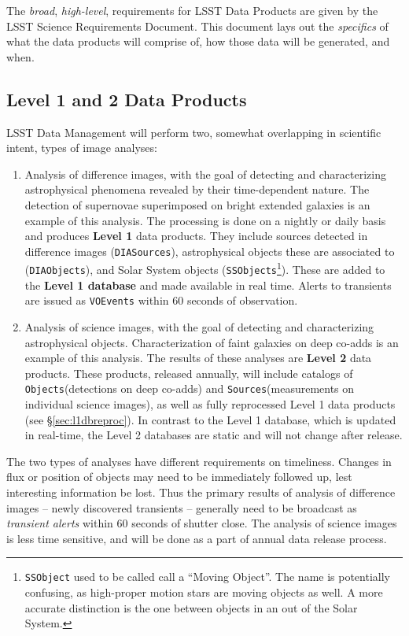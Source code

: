 \documentclass[12pt]{article}
\newcommand{\code}[1]{\texttt{#1}}
\newcommand{\DIASources}{\code{DIASources}\xspace}
\newcommand{\DIAObjects}{\code{DIAObjects}\xspace}
\newcommand{\DB}{{Level 1 database}\xspace}
\newcommand{\DR}{{Level 2 database}\xspace}
\newcommand{\Objects}{\code{Objects}\xspace}
\newcommand{\Sources}{\code{Sources}\xspace}
\newcommand{\SSObject}{\code{SSObject}\xspace}
\newcommand{\SSObjects}{\code{SSObjects}\xspace}
\newcommand{\VOEvents}{\code{VOEvents}\xspace}
\begin{document}
The {\em broad}, {\em high-level}, requirements for LSST Data Products are given by the LSST Science Requirements Document. This document lays out the {\em specifics} of what the data products will comprise of, how those data will be generated, and when.

\subsection{Level 1 and 2 Data Products}

LSST Data Management will perform two, somewhat overlapping in scientific intent, types of image analyses:

\begin{enumerate}
\item Analysis of difference images, with the goal of detecting and characterizing astrophysical phenomena revealed by their time-dependent nature. The detection of supernovae superimposed on bright extended galaxies is an example of this analysis. The processing is done on a nightly or daily basis and produces {\bf Level 1} data products. They include sources detected in difference images (\DIASources), astrophysical objects these are associated to (\DIAObjects), and Solar System objects (\SSObjects\footnote{\SSObject used to be called call a ``Moving Object''. The name is potentially confusing, as high-proper motion stars are moving objects as well. A more accurate distinction is the one between objects in an out of the Solar System.}). These are added to the {\bf \DB} and made available in real time. Alerts to transients are issued as \VOEvents within 60 seconds of observation.
\item Analysis of science images, with the goal of detecting and characterizing astrophysical objects. Characterization of faint galaxies on deep co-adds is an example of this analysis. The results of these analyses are {\bf Level 2} data products. These products, released annually, will include catalogs of \Objects (detections on deep co-adds) and \Sources (measurements on individual science images), as well as fully reprocessed Level 1 data products (see \S \ref{sec:l1dbreproc}). In contrast to the \DB, which is updated in real-time, the \DR{}s are static and will not change after release.
\end{enumerate}
 
The two types of analyses have different requirements on timeliness. Changes in flux or position of objects may need to be immediately followed up, lest interesting information be lost. Thus the primary results of analysis of difference images -- newly discovered transients -- generally need to be broadcast as {\em transient alerts} within 60 seconds of shutter close. The analysis of science images is less time sensitive, and will be done as a part of annual data release process.
\end{document}
